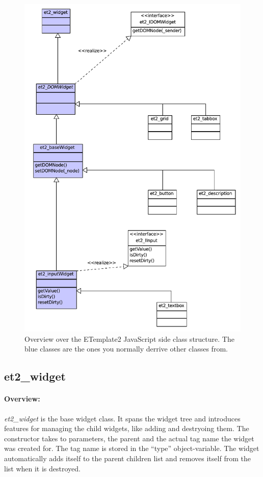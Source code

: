 \documentclass[10pt,a4paper]{report}
\begin{document}
\begin{figure}
	\begin{center}
		\includegraphics[scale=0.6]{media/class_structure.pdf}
	\end{center}
	\caption{Overview over the ETemplate2 JavaScript side class structure. The blue classes are the ones you normally derrive other classes from.}
	\label{fig:uml}
\end{figure}

\subsection*{et2\_widget}

\paragraph{Overview:}
\textit{et2\_widget} is the base widget class. It spans the widget tree and introduces features for managing the child widgets, like adding and destryoing them. The constructor takes to parameters, the parent and the actual tag name the widget was created for. The tag name is stored in the ``type'' object-variable. The widget automatically adds itself to the parent children list and removes itself from the list when it is destroyed.
\end{document}
